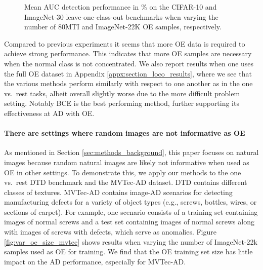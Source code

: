 \documentclass[10pt]{article} \usepackage[accepted]{stylefiles/tmlr}
\begin{document}
\begin{figure}[hbt]  \begin{center} 
      \caption{Mean AUC detection performance in \% on the CIFAR-10 and ImageNet-30 leave-one-class-out benchmarks when varying the number of 80MTI and ImageNet-22K OE samples, respectively.}
      \label{fig:var_oe_size_loco}
  \end{center}
\end{figure}


Compared to previous experiments it seems that more OE data is required to achieve strong performance. 
This indicates that more OE samples are necessary when the normal class is not concentrated.
We also report results when one uses the full OE dataset in Appendix \ref{appx:section_loco_results}, where we see that the various methods perform similarly with respect to one another as in the one vs.~rest tasks, albeit overall slightly worse due to the more difficult problem setting. Notably BCE is the best performing method, further supporting its effectiveness at AD with OE. 


\paragraph{There are settings where random images are not informative as OE}
As mentioned in Section \ref{sec:methods_background}, this paper focuses on natural images because random natural images are likely not informative when used as OE in other settings. 
To demonstrate this, we apply our methods to the one vs.~rest DTD benchmark and the MVTec-AD dataset. 
DTD contains different classes of textures.
MVTec-AD contains image-AD scenarios for detecting manufacturing defects for a variety of object types (e.g., screws, bottles, wires, or sections of carpet).
For example, one scenario consists of a training set containing images of normal screws and a test set containing images of normal screws along with images of screws with defects, which serve as anomalies.
Figure \ref{fig:var_oe_size_mvtec} shows results when varying the number of ImageNet-22k samples used as OE for training. 
We find that the OE training set size has little impact on the AD performance, especially for MVTec-AD.
\end{document}
